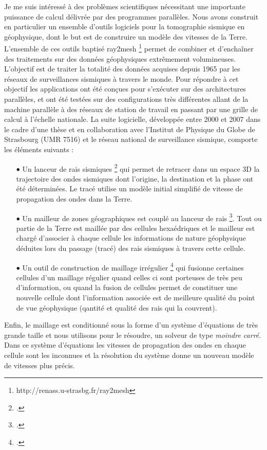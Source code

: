 \documentclass[11pt]{article}
\begin{document}
Je me suis intéressé à des problèmes scientifiques nécessitant une 
importante puissance de calcul délivrée par des programmes parallèles.
Nous avons construit en particulier un ensemble d'outils logiciels pour la tomographie sismique en 
g\'{e}ophysique, dont le but est de construire un modèle des vitesses de la Terre. 
L'ensemble de ces outils baptisé \textsf{ray2mesh}%
\footnote{http://renass.u-strasbg.fr/ray2mesh}
permet de combiner et d'enchaîner des traitements sur des données géophysiques extrêmement 
volumineuses. 
L'objectif est de traiter la totalité des données acquises depuis 1965 par les réseaux de surveillances sismiques à travers le monde. 
Pour répondre à cet objectif les applications ont été conçues pour s'exécuter sur des architectures parallèles, et ont été testées sur des configurations très différentes allant de la machine parallèle à des réseaux de station de travail en passant par une grille de calcul à l'échelle nationale.  
La suite logicielle, développée entre 2000 et 2007 dans le cadre d'une thèse et en collaboration avec l'Institut de Physique du Globe de Strasbourg (UMR 7516) et le réseau national de surveillance sismique, comporte les éléments suivants :\\
\begin{itemize}
\item[$\bullet$] Un lanceur de rais sismiques \footcite{icps-2002-20} qui permet de retracer dans un espace 3D la trajectoire des ondes sismiques dont l'origine, la destination et la phase ont été déterminées. 
Le tracé utilise un modèle initial simplifié de vitesse de propagation des ondes dans la Terre.
\item[$\bullet$] Un mailleur de zones géographiques est couplé au lanceur de rais \footcite{icps-2004-107}. 
Tout ou partie de la Terre est maillée par des cellules hexaédriques et le mailleur est chargé 
d'associer à chaque cellule les informations de nature géophysique déduites lors du passage (tracé) des rais sismiques à travers cette cellule.
\item[$\bullet$] Un outil de construction de maillage irrégulier \footcite{icps-2004-124} 
qui fusionne certaines cellules d'un maillage régulier 
quand celles ci sont porteuses de très peu d'information, 
ou quand la fusion de cellules permet de constituer une nouvelle cellule 
dont l'information associée est de meilleure qualité du point de vue géophysique 
(qantité et qualité des rais qui la couvrent).
\end{itemize}
Enfin, le maillage est conditionné sous la forme d'un système d'équations de très grande taille et
nous utilisons pour le résoudre, un solveur de type \emph{moindre carré}.
Dans ce système d'équations les vitesses de propagation des ondes en chaque cellule sont les inconnues
et la résolution du système donne un nouveau modèle de vitesses plus précis. 
\end{document}
